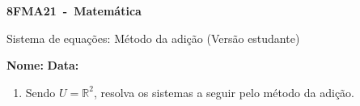 \documentclass[a4paper,14pt]{article}
\begin{document}
	
	\noindent\textbf{8FMA21~-~Matemática} 
	
	\begin{center}Sistema de equações: Método da adição (Versão estudante)
	\end{center}
	
	
	\noindent\textbf{Nome:} \underline{\hspace{10cm}}
	\noindent\textbf{Data:} \underline{\hspace{4cm}}
	
	
	\begin{multicols}{2}
	    \begin{enumerate}
	    	\item Sendo $U = \mathbb{R}^2$, resolva os sistemas a seguir pelo método da adição.
\end{enumerate}
\end{multicols}
\end{document}
